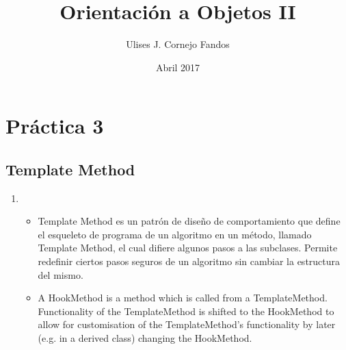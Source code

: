 \documentclass[a4paper,10pt]{article}
\title{Orientación a Objetos II}
\author{Ulises J. Cornejo Fandos}
\date{Abril 2017}
\begin{document}
\maketitle

\section{Práctica 3}

\subsection{Template Method}
\begin{enumerate}
    \item 
    \begin{itemize}
        \item  Template Method es un patrón de diseño de comportamiento que define el esqueleto de programa de un algoritmo en un método, llamado Template Method, el cual difiere algunos pasos a las subclases. Permite redefinir ciertos pasos seguros de un algoritmo sin cambiar la estructura del mismo.
    
        \item A HookMethod is a method which is called from a TemplateMethod. Functionality of the TemplateMethod is shifted to the HookMethod to allow for customisation of the TemplateMethod's functionality by later (e.g. in a derived class) changing the HookMethod.
    \end{itemize}
   
\end{enumerate}
\end{document}
